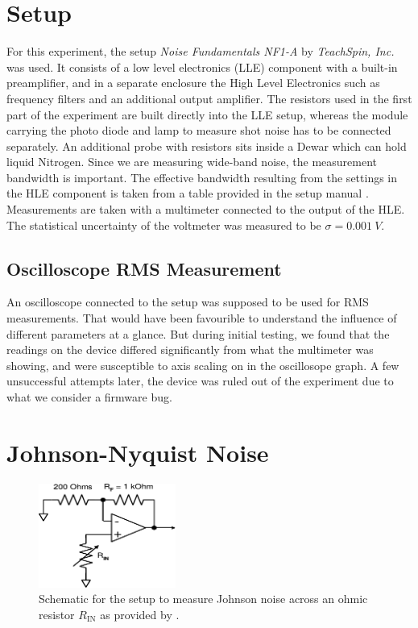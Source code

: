 \documentclass[
    parskip=half, 
    twoside=false,
    twocolumn=true,
    fontsize=11pt,
]{scrarticle}
\begin{document}
\section{Setup}
For this experiment, the setup \textit{Noise Fundamentals NF1-A} by \textit{TeachSpin, Inc.} was used. It consists of a low level electronics (LLE) component with a built-in preamplifier, and in a separate enclosure the High Level Electronics such as frequency filters and an additional output amplifier. The resistors used in the first part of the experiment are built directly into the LLE setup, whereas the module carrying the photo diode and lamp to measure shot noise has to be connected separately. An additional probe with resistors sits inside a Dewar which can hold liquid Nitrogen. Since we are measuring wide-band noise, the measurement bandwidth is important. The effective bandwidth resulting from the settings in the HLE component is taken from a table provided in the setup manual \autocite{instructions}.\\
Measurements are taken with a multimeter connected to the output of the HLE. The statistical uncertainty of the voltmeter was measured to be $\sigma = \SI{0.001}{V}$.

\subsection*{Oscilloscope RMS Measurement}
An oscilloscope connected to the setup was supposed to be used for RMS measurements. That would have been favourible to understand the influence of different parameters at a glance. But during initial testing, we found that the readings on the device differed significantly from what the multimeter was showing, and were susceptible to axis scaling on in the oscillosope graph. A few unsuccessful attempts later, the device was ruled out of the experiment due to what we consider a firmware bug.\\

\section{Johnson-Nyquist Noise}


\begin{figure}[h!]
    \centering
    \includegraphics[width=0.4\textwidth]{figures/measure_R_setup_part1.pdf}
    \caption{
        Schematic for the setup to measure Johnson noise across an ohmic resistor $R_\text{IN}$ as provided by \autocite{instructions}.
    }
    \label{fig:johnson setup R}
\end{figure}
\end{document}
